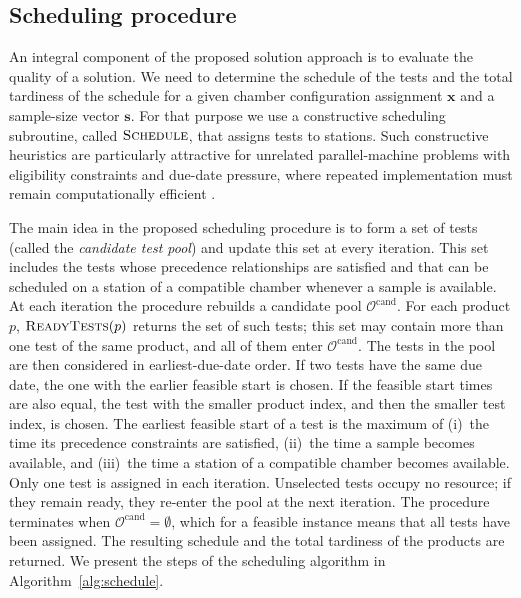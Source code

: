 \subsection{Scheduling procedure}
\label{subsec:scheduling_procedure}
\label{subsec:scheduling}

An integral component of the proposed solution approach is to evaluate the quality of a solution. We need to determine the schedule of the tests and the total tardiness of the schedule for a given chamber configuration assignment \(\mathbf{x}\) and a sample-size vector \(\mathbf{s}\). For that purpose we use a constructive scheduling subroutine, called \(\textsc{Schedule}{}\), that assigns tests to stations. Such constructive heuristics are particularly attractive for unrelated parallel-machine problems with eligibility constraints and due-date pressure, where repeated implementation must remain computationally efficient \citep{PerezGonzalezFernandezViagasZamoraGarciaFraminan2019,WangHeKerkhoveVanhoucke2017}.

The main idea in the proposed scheduling procedure is to form a set of tests (called the \emph{candidate test pool}) and update this set at every iteration. This set includes the tests whose precedence relationships are satisfied and that can be scheduled on a station of a compatible chamber whenever a sample is available. At each iteration the procedure rebuilds a candidate pool \(\mathcal{O}^{\mathrm{cand}}\). For each product \(p\), \(\textsc{ReadyTests}(p)\) returns the set of such tests; this set may contain more than one test of the same product, and all of them enter \(\mathcal{O}^{\mathrm{cand}}\). The tests in the pool are then considered in earliest-due-date order. If two tests have the same due date, the one with the earlier feasible start is chosen. If the feasible start times are also equal, the test with the smaller product index, and then the smaller test index, is chosen. The earliest feasible start of a test is the maximum of (i)~the time its precedence constraints are satisfied, (ii)~the time a sample becomes available, and (iii)~the time a station of a compatible chamber becomes available. Only one test is assigned in each iteration. Unselected tests occupy no resource; if they remain ready, they re-enter the pool at the next iteration. The procedure terminates when \(\mathcal{O}^{\mathrm{cand}}=\emptyset\), which for a feasible instance means that all tests have been assigned. The resulting schedule and the total tardiness of the products are returned. We present the steps of the scheduling algorithm in Algorithm~\ref{alg:schedule}.

